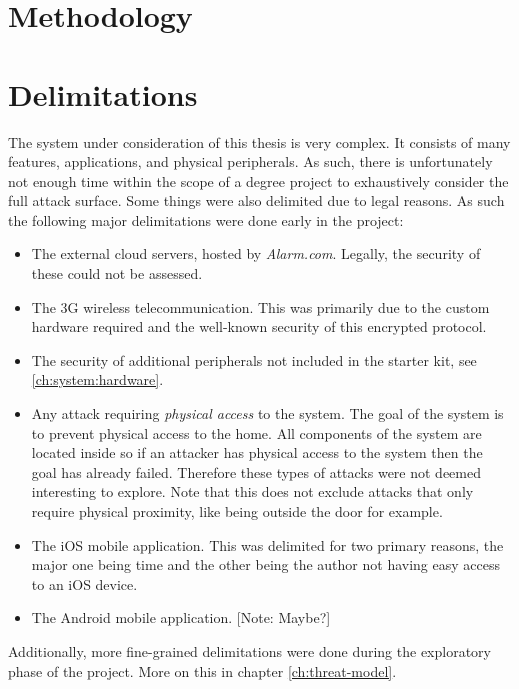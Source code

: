 \section{Methodology} \label{ch:intro:methodology}
\todo

\section{Delimitations} \label{ch:intro:delimitations}
The system under consideration of this thesis is very complex. It consists of many features, applications, and physical peripherals. As such, there is unfortunately not enough time within the scope of a degree project to exhaustively consider the full attack surface. Some things were also delimited due to legal reasons. As such the following major delimitations were done early in the project:

\begin{itemize}
    \item The external cloud servers, hosted by \textit{Alarm.com}. Legally, the security of these could not be assessed.
    \item The 3G wireless telecommunication. This was primarily due to the custom hardware required and the well-known security of this encrypted protocol.
    \item The security of additional peripherals not included in the starter kit, see \ref{ch:system:hardware}.
    \item Any attack requiring \textit{physical access} to the system. The goal of the system is to prevent physical access to the home. All components of the system are located inside so if an attacker has physical access to the system then the goal has already failed. Therefore these types of attacks were not deemed interesting to explore. Note that this does not exclude attacks that only require physical proximity, like being outside the door for example.
    \item The iOS mobile application. This was delimited for two primary reasons, the major one being time and the other being the author not having easy access to an iOS device.
    \item The Android mobile application. [Note: Maybe?]
\end{itemize}

\noindent Additionally, more fine-grained delimitations were done during the exploratory phase of the project. More on this in chapter \ref{ch:threat-model}.

